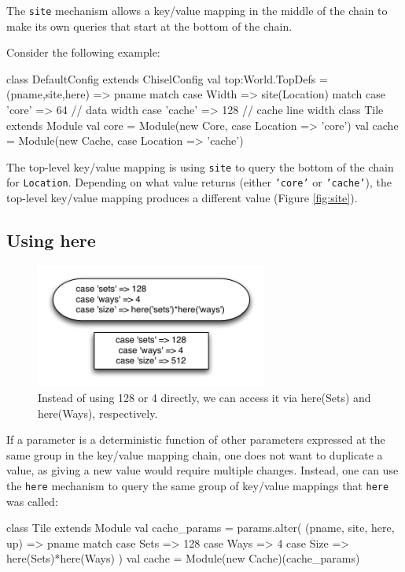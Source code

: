 \documentclass[10pt,twocolumn]{article}
\def\code#1{{\small\tt #1}}
\begin{document}
The \code{site} mechanism allows a key/value mapping in the middle of the chain to make its own queries that start at the bottom of the chain.

Consider the following example:
\begin{scala}
class DefaultConfig extends ChiselConfig { 
  val top:World.TopDefs = {
    (pname,site,here) => pname match {
       case Width => site(Location) match {
         case 'core' => 64 // data width
         case 'cache' => 128  // cache line width
       }
    }
  }
}
class Tile extends Module { 
  val core = Module(new Core, {case Location => 'core'})
  val cache = Module(new Cache, {case Location => 'cache'})
}
\end{scala}
The top-level key/value mapping is using \code{site} to query the bottom of the chain for \code{Location}. Depending on what value returns (either \code{'core'} or \code{'cache'}), the top-level key/value mapping produces a different value (Figure \ref{fig:site}).

\subsection{Using here}
\label{sec::here}

\begin{figure}[h]
\centering
\includegraphics[width=3in]{figs/here.pdf}
\caption{Instead of using 128 or 4 directly, we can access it via here(Sets) and here(Ways), respectively.}
\label{fig:alter2}
\end{figure}

If a parameter is a deterministic function of other parameters expressed at the same group in the key/value mapping chain, one does not want to duplicate a value, as giving a new value would require multiple changes. Instead, one can use the \code{here} mechanism to query the same group of key/value mappings that \code{here} was called:

\begin{scala}
class Tile extends Module { 
  val cache_params = params.alter(
    (pname, site, here, up) => pname match {
      case Sets => 128
      case Ways => 4
      case Size => here(Sets)*here(Ways)
    })
  val cache = Module(new Cache)(cache_params)
}
\end{scala}
\end{document}
